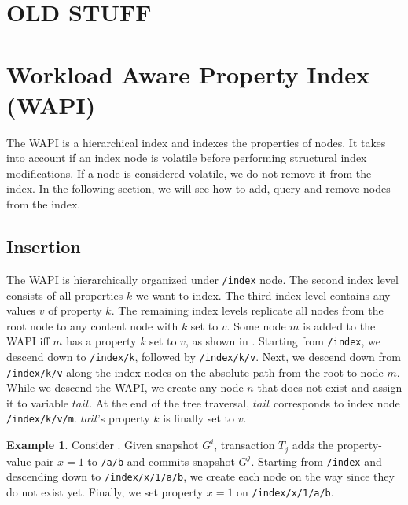 \documentclass[abstracton,12pt]{scrartcl}
\theoremstyle{definition}
\newtheorem{example}{Example}
\begin{document}
\section{OLD STUFF}

\section{Workload Aware Property Index (WAPI)}
\label{sec:wapi}

The WAPI is a hierarchical index and indexes the properties of nodes.
It takes into account if an index node is volatile before performing structural index modifications.
If a node is considered volatile, we do not remove it from the index.
In the following section, we will see how to add, query and remove nodes from the index.

\subsection{Insertion}

The WAPI is hierarchically organized under \texttt{/index} node.
The second index level consists of all properties $k$ we want to index.
The third index level contains any values $v$ of property $k$.
The remaining index levels replicate all nodes from the root node to any content node with $k$ set to $v$.
Some node $m$ is added to the WAPI iff $m$ has a property $k$ set to $v$, as shown in .
Starting from \texttt{/index}, we descend down to \texttt{/index/k}, followed by \texttt{/index/k/v}.
Next, we descend down from \texttt{/index/k/v} along the index nodes on the absolute path from the root to node $m$.
While we descend the WAPI, we create any node $n$ that does not exist and assign it to variable $tail$.
At the end of the tree traversal, $tail$ corresponds to index node \texttt{/index/k/v/m}. 
$tail$'s property $k$ is finally set to $v$.

\begin{example}
    Consider .
    Given snapshot $G^i$, transaction $T_j$ adds the property-value pair $x=1$ to \texttt{/a/b} and commits snapshot $G^j$.
    Starting from \texttt{/index} and descending down to \texttt{/index/x/1/a/b}, we create each node on the way since they do not exist yet.
    Finally, we set property $x=1$ on \texttt{/index/x/1/a/b}.
\end{example}

\vspace{1.3cm}
\end{document}
